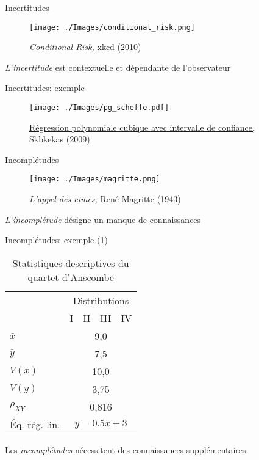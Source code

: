 \documentclass{beamer}
\begin{document}
\begin{frame}{Incertitudes}
	\begin{figure}
		\centering
		\texttt{[image: ./Images/conditional\_risk.png]}
		\caption{\href{https://www.xkcd.com/795/}{\emph{Conditional Risk,}} xkcd (2010)}
	\end{figure}
\alert{\emph{L'incertitude}} est \alert{contextuelle} et dépendante de l'observateur
\end{frame}

\begin{frame}{Incertitudes: exemple}
	\begin{figure}
		\centering
		\texttt{[image: ./Images/pg\_scheffe.pdf]}
		\caption{\href{https://commons.wikimedia.org/wiki/File:Polyreg_scheffe.svg}{Régression polynomiale cubique avec intervalle de confiance,} Skbkekas (2009)}
	\end{figure}
\end{frame}

\begin{frame}{Incomplétudes}
	\begin{figure}
		\centering
		\texttt{[image: ./Images/magritte.png]}
		\caption{\emph{L'appel des cimes,} René Magritte (1943)}
	\end{figure}
\alert{\emph{L'incomplétude}} désigne un manque de connaissances
\end{frame}

\begin{frame}{Incomplétudes: exemple (1)}
	\begin{table}
		\begin{tabular}{lcccc}
		\multicolumn{1}{l}{} & \multicolumn{4}{c}{Distributions} \\
			\cline{2-5}
                        & I & II & III & IV \\
			\hline
			\multicolumn{1}{l}{$\bar{x}$} & \multicolumn{4}{c}{9,0} \\
			\multicolumn{1}{l}{$\bar{y}$} & \multicolumn{4}{c}{7,5} \\
			\multicolumn{1}{l}{$V(x)$} & \multicolumn{4}{c}{10,0} \\
			\multicolumn{1}{l}{$V(y)$} & \multicolumn{4}{c}{3,75} \\
			\multicolumn{1}{l}{$\rho_{XY}$} & \multicolumn{4}{c}{0,816} \\
			\multicolumn{1}{l}{Éq. rég. lin.} & \multicolumn{4}{c}{$y=0.5x+3$} \\
			\hline
		 \end{tabular}
	\caption{Statistiques descriptives du quartet d'Anscombe}
	\end{table}
Les \alert{\emph{incomplétudes}} nécessitent des connaissances supplémentaires 
\end{frame}
\end{document}
